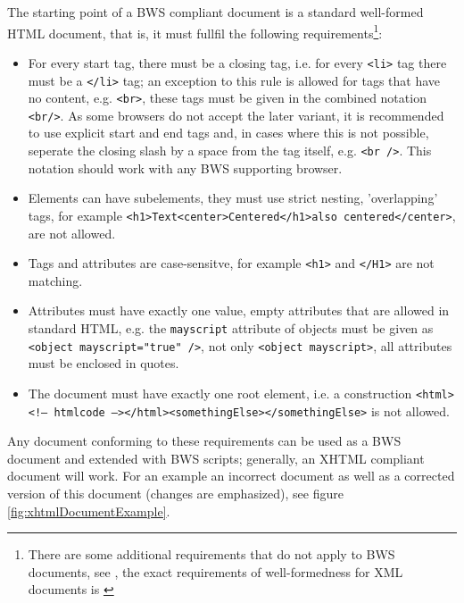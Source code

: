 The starting point of a BWS compliant document is a standard well-formed HTML document, that is, it must fullfil the following requirements\footnote{There are some additional requirements that do not apply to BWS documents, see \cite{references}, the exact requirements of well-formedness for XML documents is \cite{w3reference}}:

\begin{itemize}


\item For every start tag, there must be a closing tag, i.e. for every \texttt{<li>} tag there must be a
\texttt{</li>} tag; an exception to this rule is allowed for tags that have no content, e.g. \texttt{<br>}, these
 tags must be given in the combined notation
 \texttt{<br/>}. As some browsers do not accept the later variant, it is
 recommended to use explicit start and end tags and, in cases where this is not possible, seperate the closing slash 
 by a space from the tag itself, e.g. \texttt{<br />}. This notation should work with any BWS supporting browser.


\item Elements can have subelements, they must use strict nesting, 'overlapping' tags, for example \texttt{<h1>Text<center>Centered</h1>also centered</center>}, are not allowed.

\item Tags and attributes are case-sensitve, for example \texttt{<h1>} and \texttt{</H1>} are not matching.

\item Attributes must have exactly one value, empty attributes that are allowed in standard HTML, e.g. the \texttt{mayscript} attribute of objects must be given as \texttt{<object mayscript="true" />}, not only \texttt{<object mayscript>}, all attributes must be enclosed in quotes.

\item The document must have exactly one root element, i.e. a construction \texttt{<html><!-- htmlcode --></html><somethingElse></somethingElse>} is not allowed. 

\end{itemize}

Any document conforming to these requirements can be used as a BWS document and extended with BWS scripts; generally, an XHTML compliant document will work. For an example an incorrect document as well as a corrected version of this document (changes are emphasized), see figure \ref{fig:xhtmlDocumentExample}. 

